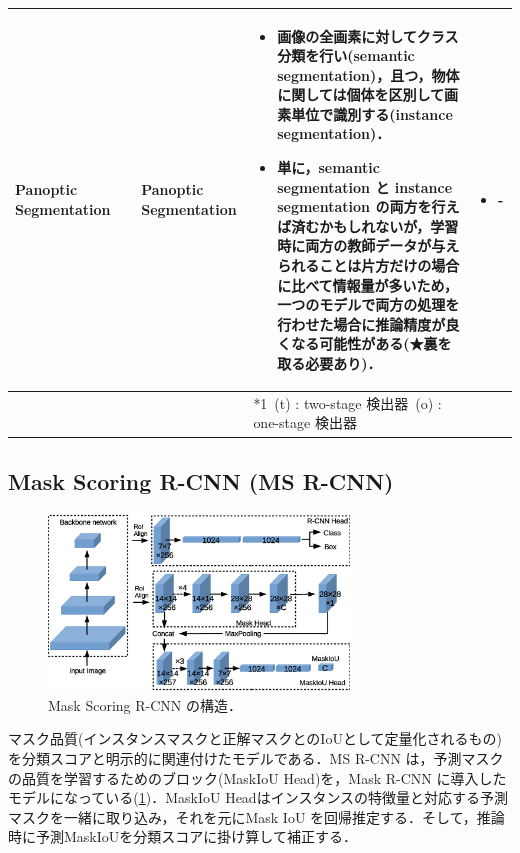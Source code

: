 \documentclass[originalpaper]{jsaiart}     %
\begin{document}
\begin{table}
\begin{center}
\begin{tabularx}{\linewidth}{Xp{1.5cm}Xp{7cm}X}
            Panoptic Segmentation & \cite{KHGRD19} & Panoptic Segmentation & 
            \begin{itemize}
                \vspace{-0.7\baselineskip}
                \setlength{\leftskip}{-3mm}
                \item 画像の全画素に対してクラス分類を行い(semantic segmentation)，且つ，物体に関しては個体を区別して画素単位で識別する(instance segmentation)．
                \item 単に，semantic segmentation と instance segmentation の両方を行えば済むかもしれないが，学習時に両方の教師データが与えられることは片方だけの場合に比べて情報量が多いため，一つのモデルで両方の処理を行わせた場合に推論精度が良くなる可能性がある(★裏を取る必要あり)．
            \end{itemize}
            &
            \begin{itemize}
                \vspace{-0.7\baselineskip}
                \setlength{\leftskip}{-3mm}
                \item -
            \end{itemize}
            \\
            \bottomrule
            &  &  & *1\ (t) : two-stage 検出器\quad *2\ (o) : one-stage 検出器 &  \\
        \end{tabularx}
    \end{center}
\end{table}%

\subsection{Mask Scoring R-CNN (MS R-CNN)}
\begin{figure}[tb]
    \begin{center}
        \includegraphics[width=8cm,clip]{fig/archi_ms_rcnn.eps}
    \end{center}
    \caption{ Mask Scoring R-CNN の構造．}
    \label{fig:archi_ms_rcnn}
\end{figure}
マスク品質(インスタンスマスクと正解マスクとのIoUとして定量化されるもの)を分類スコアと明示的に関連付けたモデルである\cite{HHGHW19}．MS R-CNN は，予測マスクの品質を学習するためのブロック(MaskIoU Head)を，Mask R-CNN\cite{HGDG17} に導入したモデルになっている(\ref{fig:archi_ms_rcnn})．MaskIoU Headはインスタンスの特徴量と対応する予測マスクを一緒に取り込み，それを元にMask IoU を回帰推定する．そして，推論時に予測MaskIoUを分類スコアに掛け算して補正する．
\end{document}
